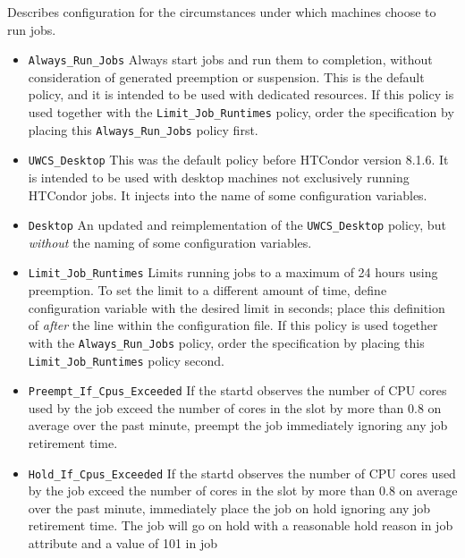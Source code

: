\begin{description}
\label{usecategory:POLICY}
\item[\MacroNI{POLICY}]
  Describes configuration for the circumstances under which
  machines choose to run jobs.
  \begin{itemize}
    \item \texttt{Always\_Run\_Jobs}
    Always start jobs and run them to completion, without consideration of
     generated preemption or suspension.
    This is the default policy, and it is intended to be used with dedicated
    resources.
    If this policy is used together with the \texttt{Limit\_Job\_Runtimes}
    policy,
    order the specification by placing this \texttt{Always\_Run\_Jobs} 
    policy first. 
    \item \texttt{UWCS\_Desktop}
    This was the default policy before HTCondor version 8.1.6.
    It is intended to be used with desktop machines not exclusively running
    HTCondor jobs.
    It injects  into the name of some configuration variables.
    \item \texttt{Desktop}
    An updated and reimplementation of the \texttt{UWCS\_Desktop} policy,
    but \emph{without} the  naming of some configuration variables.
    \item \texttt{Limit\_Job\_Runtimes}
    Limits running jobs to a maximum of 24 hours using preemption.
    To set the limit to a different amount of time, 
    define configuration variable 
    with the desired limit in seconds;
    place this definition of  \emph{after} the
     line within the configuration
    file.  
    If this policy is used together with the \texttt{Always\_Run\_Jobs} policy,
    order the specification by placing this \texttt{Limit\_Job\_Runtimes} 
    policy second. 
	\item \texttt{Preempt\_If\_Cpus\_Exceeded}
	If the startd observes the number of CPU cores used by the job exceed
	the number of cores in the slot by more than 0.8 on average over the past
	minute, preempt the job immediately
	ignoring any job retirement time.
	\item \texttt{Hold\_If\_Cpus\_Exceeded}
	If the startd observes the number of CPU cores used by the job exceed
	the number of cores in the slot by more than 0.8 on average over the past
	minute, immediately place the job on hold
	ignoring any job retirement time.  The job will go on hold with a reasonable
	hold reason in job attribute  and a value of 101 in job

\end{itemize}
\end{description}
